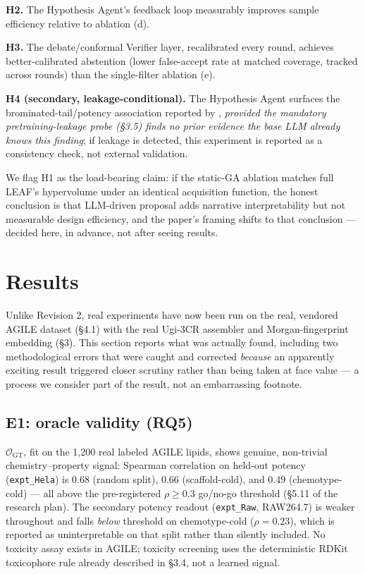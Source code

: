 \documentclass{article}
\begin{document}
\textbf{H2.} The Hypothesis Agent's feedback loop measurably improves
sample efficiency relative to ablation (d).

\textbf{H3.} The debate/conformal Verifier layer, recalibrated every
round, achieves better-calibrated abstention (lower false-accept rate at
matched coverage, tracked across rounds) than the single-filter ablation
(e).

\textbf{H4 (secondary, leakage-conditional).} The Hypothesis Agent
surfaces the brominated-tail/potency association reported by
\citet{lumilab2026}, \emph{provided the mandatory pretraining-leakage
probe (\S3.5) finds no prior evidence the base LLM already knows this
finding}; if leakage is detected, this experiment is reported as a
consistency check, not external validation.

We flag H1 as the load-bearing claim: if the static-GA ablation matches
full LEAF's hypervolume under an identical acquisition function, the
honest conclusion is that LLM-driven proposal adds narrative
interpretability but not measurable design efficiency, and the paper's
framing shifts to that conclusion --- decided here, in advance, not after
seeing results.

\section{Results}

Unlike Revision 2, real experiments have now been run on the real, vendored
AGILE dataset (\S4.1) with the real Ugi-3CR assembler and Morgan-fingerprint
embedding (\S3). This section reports what was actually found, including
two methodological errors that were caught and corrected \emph{because}
an apparently exciting result triggered closer scrutiny rather than being
taken at face value --- a process we consider part of the result, not an
embarrassing footnote.

\subsection{E1: oracle validity (RQ5)}

$\mathcal{O}_{\text{GT}}$, fit on the 1,200 real labeled AGILE lipids, shows
genuine, non-trivial chemistry--property signal: Spearman correlation on
held-out potency (\texttt{expt\_Hela}) is 0.68 (random split), 0.66
(scaffold-cold), and 0.49 (chemotype-cold) --- all above the pre-registered
$\rho \ge 0.3$ go/no-go threshold (\S5.11 of the research plan). The
secondary potency readout (\texttt{expt\_Raw}, RAW264.7) is weaker
throughout and falls \emph{below} threshold on chemotype-cold ($\rho =
0.23$), which is reported as uninterpretable on that split rather than
silently included. No toxicity assay exists in AGILE; toxicity screening
uses the deterministic RDKit toxicophore rule already described in \S3.4,
not a learned signal.
\end{document}
